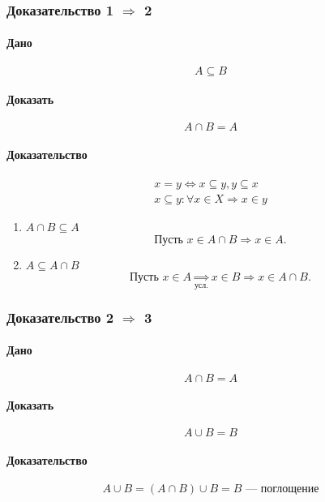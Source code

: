 \documentclass{article}
\begin{document}
\subsubsection{Доказательство 1 $\Rightarrow$ 2}
\paragraph{Дано}
\[
    A \subseteq B
\]

\paragraph{Доказать}
\[
    A \cap B = A
\]

\paragraph{Доказательство}
\begin{gather*}
    x = y \Leftrightarrow x \subseteq y, y \subseteq x \\
    x \subseteq y: \forall x \in X \Rightarrow x \in y
\end{gather*}
\begin{enumerate}
    \item $A \cap B \subseteq A$
    \[
        \text{Пусть } x \in A \cap B \Rightarrow x \in A.
    \]
    \item $A \subseteq A \cap B$
    \[
        \text{Пусть } x \in A \underset{\text{усл.}}{\Rightarrow} x \in B \Rightarrow x \in A \cap B.
    \]
\end{enumerate}


\subsubsection{Доказательство 2 $\Rightarrow$ 3}
\paragraph{Дано}
\[
    A \cap B = A
\]

\paragraph{Доказать}
\[
    A \cup B = B
\]

\paragraph{Доказательство}
\[
    A \cup B = (A \cap B) \cup B = B \text{ --- поглощение}
\]
\end{document}
